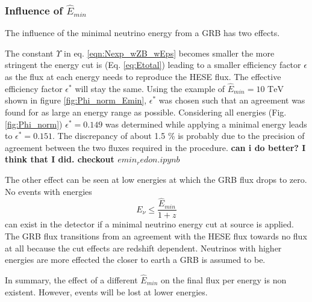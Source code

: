 \subsubsection{Influence of $\hat{E}_{min}$}
The influence of the minimal neutrino energy from a GRB has two effects.

The constant $\Upsilon$ in eq. \ref{eqn:Nexp_wZB_wEps} becomes smaller the more
stringent the energy cut is (Eq. \ref{eq:Etotal}) leading to a smaller
efficiency factor $\epsilon$ as the flux at each energy needs to
reproduce the HESE flux. The effective efficiency factor $\epsilon^*$ will stay
the same.
Using the example of $\hat{E}_{min} = 10 \text{ TeV}$ shown in figure
\ref{fig:Phi_norm_Emin}, $\epsilon^*$ was chosen such that an agreement was
found for as large an energy range as possible. Considering all energies (Fig.
\ref{fig:Phi_norm}) $\epsilon^*=0.149$ was determined while applying a minimal
energy leads to  $\epsilon^*=0.151$. The discrepancy of about 1.5 \%  is
probably due to the precision of agreement between the two fluxes required in
the procedure. \textbf{can i do better? I think that I did. checkout 
$emin_redon.ipynb$}

The other effect can be seen at low energies at which the GRB flux drops to
zero. No events with energies
\begin{equation}
 E_\nu \leq \frac{\hat{E}_{min}}{1+z}
\end{equation}
can exist in the detector if a minimal neutrino energy cut at source is
applied. The GRB flux transitions from an agreement with the HESE flux towards
no flux at all because the cut effects are redshift dependent. Neutrinos 
with higher
energies are more effected the  closer to earth a GRB is assumed to be.

In summary, the effect of a different $\hat{E}_{min}$ on the final flux per
energy is non existent. However, events will be lost at lower energies. 


